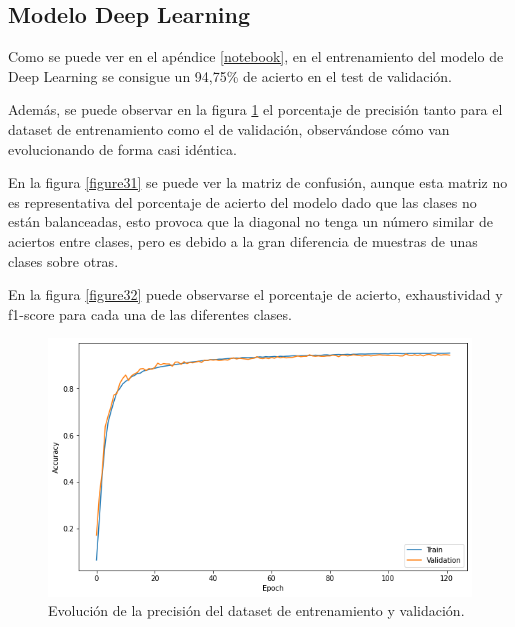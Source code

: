 \documentclass[../main.tex]{subfiles}
\begin{document}
\subsection{Modelo Deep Learning}

Como se puede ver en el apéndice \ref{notebook}, en el entrenamiento del modelo de Deep Learning se consigue un 94,75\% de acierto en el test de validación.

Además, se puede observar en la figura \ref{figure30} el porcentaje de precisión tanto para el dataset de entrenamiento como el de validación, observándose cómo van evolucionando de forma casi idéntica.

En la figura \ref{figure31} se puede ver la matriz de confusión, aunque esta matriz no es representativa del porcentaje de acierto del modelo dado que las clases no están balanceadas, esto provoca que la diagonal no tenga un número similar de aciertos entre clases, pero es debido a la gran diferencia de muestras de unas clases sobre otras.

En la figura \ref{figure32} puede observarse el porcentaje de acierto, exhaustividad y f1-score para cada una de las diferentes clases.

\begin{figure}[h]
\centering 
\includegraphics[width=1\textwidth]{notebook/output_9_0.png}
\caption{Evolución de la precisión del dataset de entrenamiento y validación.}
\label{figure30}
\end{figure}
\end{document}
